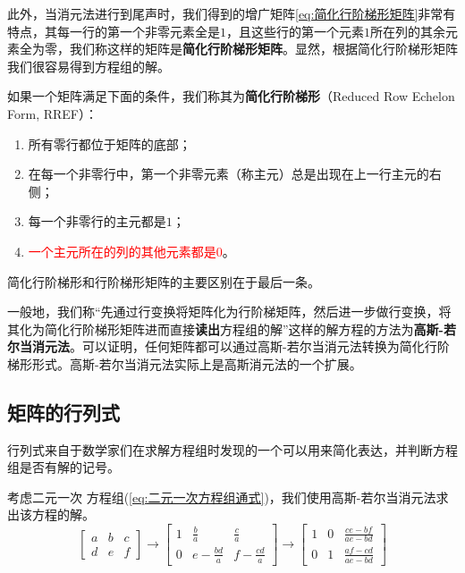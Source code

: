 此外，当消元法进行到尾声时，我们得到的增广矩阵\ref{eq:简化行阶梯形矩阵}非常有特点，其每一行的第一个非零元素全是$1$，且这些行的第一个元素$1$所在列的其余元素全为零，我们称这样的矩阵是\textcolor{third}{\bf 简化行阶梯形矩阵}。显然，根据简化行阶梯形矩阵我们很容易得到方程组的解。

\begin{definition}[简化行阶梯形]
    如果一个矩阵满足下面的条件，我们称其为{\bf 简化行阶梯形}（Reduced Row Echelon Form, RREF）：
\begin{enumerate}
    \item 所有零行都位于矩阵的底部；
    \item 在每一个非零行中，第一个非零元素（称主元）总是出现在上一行主元的右侧；
    \item 每一个非零行的主元都是$1$；
    \item \textcolor{red}{一个主元所在的列的其他元素都是$0$}。
\end{enumerate}

简化行阶梯形和行阶梯形矩阵的主要区别在于最后一条。

\end{definition}

一般地，我们称\textcolor{second}{“先通过行变换将矩阵化为行阶梯矩阵，然后进一步做行变换，将其化为简化行阶梯形矩阵进而直接\textbf{读出}方程组的解”}这样的解方程的方法为\textcolor{third}{\bf 高斯-若尔当消元法}。可以证明，任何矩阵都可以通过高斯-若尔当消元法转换为简化行阶梯形形式。高斯-若尔当消元法实际上是高斯消元法的一个扩展。

\subsection{矩阵的行列式}
\label{subsec:矩阵的行列式}

\begin{note}
    行列式来自于数学家们在求解方程组时发现的一个可以用来简化表达，并判断方程组是否有解的记号。
\end{note}

\vspace*{0.3cm}

考虑二元一次    方程组(\ref{eq:二元一次方程组通式})，我们使用高斯-若尔当消元法求出该方程的解。
\begin{equation*}
\left[
\begin{array}{cc|c}
a & b & c \\
d & e & f
\end{array}
\right]
\xrightarrow{}
    \left[
    \begin{array}{cc|c}
1 & \frac{b}{a} & \frac{c}{a} \\
0 & e - \frac{bd}{a} & f - \frac{cd}{a}
\end{array}
\right]
\xrightarrow{}
\left[
\begin{array}{cc|c}
1 & 0 & \frac{ce - bf}{ae - bd} \\
0 & 1 & \frac{af - cd}{ae - bd}
\end{array}
\right]
\end{equation*}

